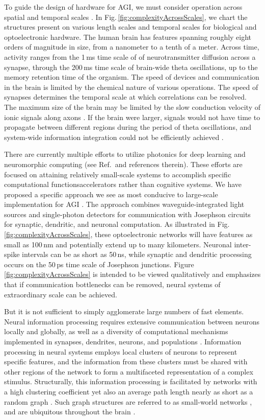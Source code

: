 \documentclass[twocolumn]{article}
\begin{document}
To guide the design of hardware for AGI, we must consider operation across spatial and temporal scales \cite{beba2016}. In Fig.\,\ref{fig:complexityAcrossScales}, we chart the structures present on various length scales and temporal scales for biological and optoelectronic hardware. The human brain has features spanning roughly eight orders of magnitude in size, from a nanometer to a tenth of a meter. Across time, activity ranges from the 1\,ms time scale of of neurotransmitter diffusion across a synapse, through the 200\,ms time scale of brain-wide theta oscillations, up to the memory retention time of the organism. The speed of devices and communication in the brain is limited by the chemical nature of various operations. The speed of synapses determines the temporal scale at which correlations can be resolved. The maximum size of the brain may be limited by the slow conduction velocity of ionic signals along axons \cite{bu2006,shICRC2018}. If the brain were larger, signals would not have time to propagate between different regions during the period of theta oscillations, and system-wide information integration could not be efficiently achieved \cite{bu2006}. 

There are currently multiple efforts to utilize photonics for deep learning \cite{shha2016,chsa2018} and neuromorphic computing (see Ref.\,\cite{prsh2017} and references therein). These efforts are focused on attaining relatively small-scale systems to accomplish specific computational functions\textemdash accelerators rather than cognitive systems. We have proposed a specific approach we see as most conducive to large-scale implementation for AGI \cite{sh2018,sh2018_full,shICRC2018}. The approach combines waveguide-integrated light sources and single-photon detectors for communication with Josephson circuits for synaptic, dendritic, and neuronal computation. As illustrated in Fig.\,\ref{fig:complexityAcrossScales}, these optoelectronic networks will have features as small as 100\,nm and potentially extend up to many kilometers. Neuronal inter-spike intervals can be as short as 50\,ns, while synaptic and dendritic processing occurs on the 50\,ps time scale of Josephson junctions. Figure\,\ref{fig:complexityAcrossScales} is intended to be viewed qualitatively and emphasizes that if communication bottlenecks can be removed, neural systems of extraordinary scale can be achieved.

But it is not sufficient to simply agglomerate large numbers of fast elements. Neural information processing requires extensive communication between neurons locally and globally, as well as a diversity of computational mechanisms implemented in synapses, dendrites, neurons, and populations \cite{geki2002,bu2006}. Information processing in neural systems employs local clusters of neurons to represent specific features, and the information from these clusters must be shared with other regions of the network to form a multifaceted representation of a complex stimulus. Structurally, this information processing is facilitated by networks with a high clustering coefficient yet also an average path length nearly as short as a random graph \cite{eskn2015}. Such graph structures are referred to as small-world networks \cite{wast1998}, and are ubiquitous throughout the brain \cite{sp2010}. 
\end{document}
